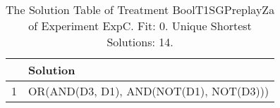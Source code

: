\begin{table}[ht]
\centering
\begin{tabular}{rp{9cm}}
  \hline
 & Solution \\ 
  \hline
1 & OR(AND(D3, D1), AND(NOT(D1), NOT(D3))) \\ 
   \hline
\end{tabular}
\caption{The Solution Table of Treatment BoolT1SGPreplayZa of Experiment ExpC. Fit: 0. Unique Shortest Solutions: 14.} 
\end{table}
